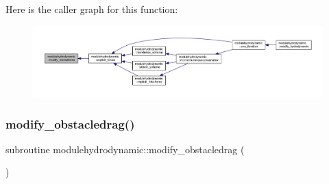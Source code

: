 Here is the caller graph for this function\+:\nopagebreak
\begin{figure}[H]
\begin{center}
\leavevmode
\includegraphics[width=350pt]{namespacemodulehydrodynamic_abdc575076528a23bb728d486a9919cdf_icgraph}
\end{center}
\end{figure}
\mbox{\label{namespacemodulehydrodynamic_a0305b5a5c3b3ae37a5cbe73fd9fe29c6}} 
\subsubsection{\texorpdfstring{modify\+\_\+obstacledrag()}{modify\_obstacledrag()}}
{\footnotesize\ttfamily subroutine modulehydrodynamic\+::modify\+\_\+obstacledrag (\begin{DoxyParamCaption}{ }\end{DoxyParamCaption})\hspace{0.3cm}{\ttfamily [private]}}

